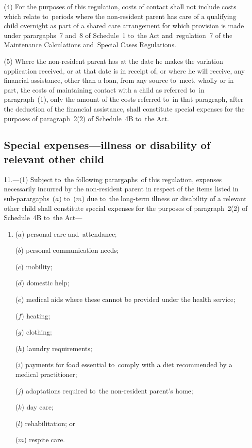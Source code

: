 \documentclass[12pt,a4paper]{article}
\begin{document}
(4) For the purposes of this regulation, costs of contact shall not include costs which relate to~periods where the non-resident parent has care of a qualifying child overnight as part of a shared care arrangement for which provision is made under parargaphs~7 and~8 of Schedule~1 to~the Act and~regulation~7 of the Maintenance Calculations and~Special Cases Regulations.

(5) Where the non-resident parent has at the date he makes the variation application received, or at that date is in receipt of, or where he will receive, any financial assistance, other than a loan, from any source to~meet, wholly or in part, the costs of maintaining contact with a child as referred to~in paragraph~(1), only the amount of the costs referred to~in that paragraph, after the deduction of the financial assistance, shall constitute special expenses for the purposes of paragraph~2(2) of Schedule~4B to~the Act.

\subsection[11. Special expenses—illness or disability of relevant other child]{\sloppy Special expenses—illness or disability of relevant other child}

11.---(1)  Subject to~the following parargaphs~of this regulation, expenses necessarily incurred by the non-resident parent in respect of the items listed in sub-parargaphs~($a$)  to~($m$)  due to~the long-term illness or disability of a relevant other child shall constitute special expenses for the purposes of paragraph~2(2) of Schedule~4B to~the Act—
\begin{enumerate}\item[]
($a$) personal care and~attendance;

($b$) personal communication needs;

($c$) mobility;

($d$) domestic help;

($e$) medical aids where these cannot be provided under the health service;

($f$) heating;

($g$) clothing;

($h$) laundry requirements;

($i$) payments for food essential to~comply with a diet recommended by a medical practitioner;

($j$) adaptations required to~the non-resident parent’s home;

($k$) day care;

($l$) rehabilitation; or

($m$) respite care.
\end{enumerate}
\end{document}
